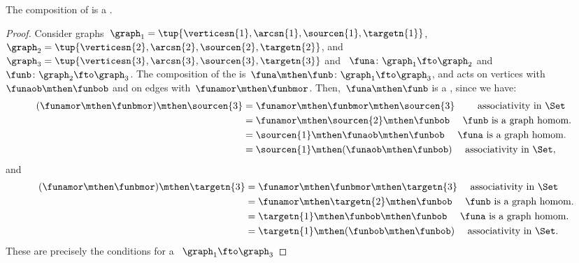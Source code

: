 \begin{lemma}
    \label{lem:composing_homomorphisms}
    The composition of  is a .
\end{lemma}
%
\begin{proof}
    Consider graphs~$\graph_1=\tup{\verticesn{1},\arcsn{1},\sourcen{1},\targetn{1}}$,~$\graph_2=\tup{\verticesn{2},\arcsn{2},\sourcen{2},\targetn{2}}$, and~$\graph_3=\tup{\verticesn{3},\arcsn{3},\sourcen{3},\targetn{3}}$ and
    ~$\funa \colon \graph_1 \fto \graph_2$ and~$\funb \colon \graph_2 \fto \graph_3$.
    The composition of the  is~$\funa\mthen \funb \colon \graph_1 \fto \graph_3$, and acts on vertices with~$\funaob \mthen \funbob$ and on edges with~$\funamor \mthen \funbmor$.
    Then,~$\funa\mthen \funb$ is a , since we have:
    \begin{equation}
        \begin{aligned}
            (\funamor\mthen \funbmor) \mthen \sourcen{3} & =\funamor\mthen \funbmor \mthen \sourcen{3} \qquad \text{ associativity in \Set} \\
                                                         & =\funamor\mthen \sourcen{2} \mthen \funbob \quad \text{ $\funb$ is a graph homom.
            } \\
                                                         & =\sourcen{1} \mthen \funaob\mthen \funbob \quad \text{ $\funa$ is a graph homom.} \\
                                                         & =\sourcen{1} \mthen (\funaob\mthen \funbob) \quad \text{ associativity in \Set},
        \end{aligned}
    \end{equation}
    and
    \begin{equation}
        \begin{aligned}
            (\funamor \mthen \funbmor) \mthen \targetn{3} & =\funamor \mthen \funbmor \mthen \targetn{3} \quad \text{ associativity in \Set} \\
                                                          & =\funamor \mthen \targetn{2}\mthen \funbob \quad \text{ $\funb$ is a graph homom.} \\
                                                          & =\targetn{1} \mthen \funbob\mthen \funbob \quad \text{ $\funa$ is a graph homom.} \\
                                                          & =\targetn{1} \mthen (\funbob\mthen \funbob)\quad \text{ associativity in \Set}.
        \end{aligned}
    \end{equation}
    These are precisely the conditions for a ~$\graph_1 \fto \graph_3$
\end{proof}
